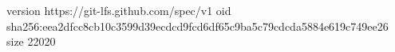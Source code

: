 version https://git-lfs.github.com/spec/v1
oid sha256:eea2dfcc8cb10c3599d39ecdcd9fcd6df65c9ba5c79cdcda5884e619c749ee26
size 22020
